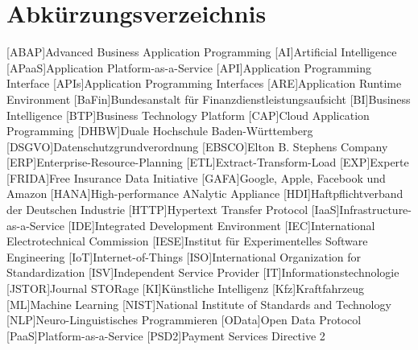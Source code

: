 \clearpage
\chapter*{Abkürzungsverzeichnis}	

\begin{acronym}[XXXXXXX]
	[ABAP]{Advanced Business Application Programming}
	[AI]{Artificial Intelligence}
	[APaaS]{Application Platform-as-a-Service}
	[API]{Application Programming Interface}
	[APIs]{Application Programming Interfaces}	
	[ARE]{Application Runtime Environment}
	[BaFin]{Bundesanstalt für Finanzdienstleistungsaufsicht}
	[BI]{Business Intelligence}
	[BTP]{Business Technology Platform}
	[CAP]{Cloud Application Programming}
	[DHBW]{Duale Hochschule Baden-Württemberg}
	[DSGVO]{Datenschutzgrundverordnung}
	[EBSCO]{Elton B. Stephens Company}
	[ERP]{Enterprise-Resource-Planning}
	[ETL]{Extract-Transform-Load}
	[EXP]{Experte}
	[FRIDA]{Free Insurance Data Initiative}
	[GAFA]{Google, Apple, Facebook und Amazon}
	[HANA]{High-performance ANalytic Appliance}
	[HDI]{Haftpflichtverband der Deutschen Industrie}
	[HTTP]{Hypertext Transfer Protocol}
	[IaaS]{Infrastructure-as-a-Service}
	[IDE]{Integrated Development Environment}
	[IEC]{International Electrotechnical Commission}
	[IESE]{Institut für Experimentelles Software Engineering}
	[IoT]{Internet-of-Things}
	[ISO]{International Organization for Standardization}
	[ISV]{Independent Service Provider}
	[IT]{Informationstechnologie}
	[JSTOR]{Journal STORage}
	[KI]{Künstliche Intelligenz}
	[Kfz]{Kraftfahrzeug}
	[ML]{Machine Learning}
	[NIST]{National Institute of Standards and Technology}
	[NLP]{Neuro-Linguistisches Programmieren}
	[OData]{Open Data Protocol}
	[PaaS]{Platform-as-a-Service}
	[PSD2]{Payment Services Directive 2}

\end{acronym}

